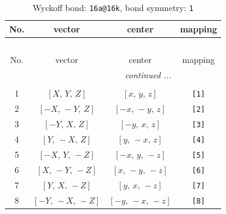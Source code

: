 \documentclass[fleqn,8pt]{jsarticle}
\begin{document}
\begin{longtable}{cccc}
\caption{Wyckoff bond: {\tt 16a@16k}, bond symmetry: {\tt 1}}
 \\
 \hline \hline
No. & vector & center & mapping \\ \hline \endfirsthead

\multicolumn{3}{l}{\tablename\ \thetable{}} \\
 \hline \hline
No. & vector & center & mapping \\ \hline \endhead

 \hline \hline
\multicolumn{3}{r}{\footnotesize\it continued ...} \\ \endfoot

 \hline \hline
\multicolumn{3}{r}{} \\ \endlastfoot

1 & $\left[ X,\, Y,\, Z \right]$ & $\left[ x,\, y,\, z \right]$ & {\tt [1]} \\ \hline
2 & $\left[ - X,\, - Y,\, Z \right]$ & $\left[ - x,\, - y,\, z \right]$ & {\tt [2]} \\ \hline
3 & $\left[ - Y,\, X,\, Z \right]$ & $\left[ - y,\, x,\, z \right]$ & {\tt [3]} \\ \hline
4 & $\left[ Y,\, - X,\, Z \right]$ & $\left[ y,\, - x,\, z \right]$ & {\tt [4]} \\ \hline
5 & $\left[ - X,\, Y,\, - Z \right]$ & $\left[ - x,\, y,\, - z \right]$ & {\tt [5]} \\ \hline
6 & $\left[ X,\, - Y,\, - Z \right]$ & $\left[ x,\, - y,\, - z \right]$ & {\tt [6]} \\ \hline
7 & $\left[ Y,\, X,\, - Z \right]$ & $\left[ y,\, x,\, - z \right]$ & {\tt [7]} \\ \hline
8 & $\left[ - Y,\, - X,\, - Z \right]$ & $\left[ - y,\, - x,\, - z \right]$ & {\tt [8]} \\
\end{longtable}
\end{document}
